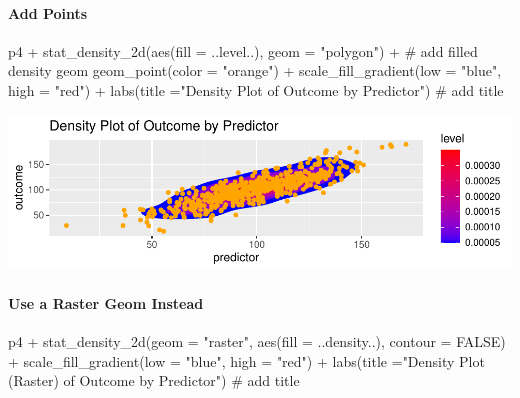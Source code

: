 \documentclass[12pt,]{article}
\newenvironment{Shaded}{}{}
\newcommand{\CommentTok}[1]{\textcolor[rgb]{0.00,0.50,0.00}{#1}}
\newcommand{\DataTypeTok}[1]{#1}
\newcommand{\KeywordTok}[1]{\textcolor[rgb]{0.00,0.00,1.00}{#1}}
\newcommand{\NormalTok}[1]{#1}
\newcommand{\OperatorTok}[1]{#1}
\newcommand{\OtherTok}[1]{\textcolor[rgb]{1.00,0.25,0.00}{#1}}
\newcommand{\StringTok}[1]{\textcolor[rgb]{0.00,0.50,0.50}{#1}}
\let\oldparagraph\paragraph
\renewcommand{\paragraph}[1]{\oldparagraph{#1}\mbox{}}
\begin{document}
\hypertarget{add-points}{%
\paragraph{Add Points}\label{add-points}}

\begin{Shaded}
\begin{Highlighting}[]
\NormalTok{p4 }\OperatorTok{+}\StringTok{ }
\StringTok{  }\KeywordTok{stat_density_2d}\NormalTok{(}\KeywordTok{aes}\NormalTok{(}\DataTypeTok{fill =}\NormalTok{ ..level..), }
                  \DataTypeTok{geom =} \StringTok{"polygon"}\NormalTok{) }\OperatorTok{+}\StringTok{ }\CommentTok{# add filled density geom}
\StringTok{  }\KeywordTok{geom_point}\NormalTok{(}\DataTypeTok{color =} \StringTok{"orange"}\NormalTok{) }\OperatorTok{+}
\StringTok{    }\KeywordTok{scale_fill_gradient}\NormalTok{(}\DataTypeTok{low =} \StringTok{"blue"}\NormalTok{,}
                      \DataTypeTok{high =} \StringTok{"red"}\NormalTok{) }\OperatorTok{+}
\StringTok{  }\KeywordTok{labs}\NormalTok{(}\DataTypeTok{title =}\StringTok{"Density Plot of Outcome by Predictor"}\NormalTok{) }\CommentTok{# add title}
\end{Highlighting}
\end{Shaded}

\includegraphics{introduction-to-ggplot2_files/figure-latex/unnamed-chunk-21-1.pdf}

\hypertarget{use-a-raster-geom-instead}{%
\paragraph{Use a Raster Geom Instead}\label{use-a-raster-geom-instead}}

\begin{Shaded}
\begin{Highlighting}[]
\NormalTok{p4 }\OperatorTok{+}\StringTok{ }
\StringTok{  }\KeywordTok{stat_density_2d}\NormalTok{(}\DataTypeTok{geom =} \StringTok{"raster"}\NormalTok{, }
                  \KeywordTok{aes}\NormalTok{(}\DataTypeTok{fill =}\NormalTok{ ..density..),}
                  \DataTypeTok{contour =} \OtherTok{FALSE}\NormalTok{) }\OperatorTok{+}
\StringTok{  }\KeywordTok{scale_fill_gradient}\NormalTok{(}\DataTypeTok{low =} \StringTok{"blue"}\NormalTok{,}
                      \DataTypeTok{high =} \StringTok{"red"}\NormalTok{) }\OperatorTok{+}
\StringTok{  }\KeywordTok{labs}\NormalTok{(}\DataTypeTok{title =}\StringTok{"Density Plot (Raster) of Outcome by Predictor"}\NormalTok{) }\CommentTok{# add title}
\end{Highlighting}
\end{Shaded}
\end{document}

